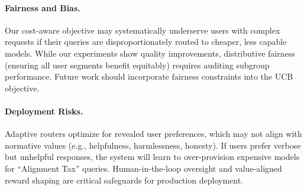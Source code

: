 \paragraph{Fairness and Bias.}
Our cost-aware objective may systematically underserve users with complex requests if their queries are disproportionately routed to cheaper, less capable models. While our experiments show quality improvements, distributive fairness (ensuring all user segments benefit equitably) requires auditing subgroup performance. Future work should incorporate fairness constraints into the UCB objective.

\paragraph{Deployment Risks.}
Adaptive routers optimize for revealed user preferences, which may not align with normative values (e.g., helpfulness, harmlessness, honesty). If users prefer verbose but unhelpful responses, the system will learn to over-provision expensive models for ``Alignment Tax'' queries. Human-in-the-loop oversight and value-aligned reward shaping are critical safeguards for production deployment.

